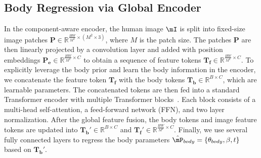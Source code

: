 \documentclass[10pt,twocolumn,letterpaper]{article}
\begin{document}
\subsection{Body Regression via Global Encoder}
\label{sec:method_2}
In the component-aware encoder, the human image $\mI$ is split into fixed-size image patches $\mathbf{P}\in \mathbb{R}^{\frac{HW}{M^2}\times (M^2\times3)}$, where $M$ is the patch size. The patches $\mathbf{P}$ are then linearly projected by a convolution layer and added with position embeddings $\mathbf{P_e} \in \mathbb{R}^{\frac{HW}{M^2}\times C}$ to obtain a sequence of feature tokens $\mathbf{T_f}\in \mathbb{R}^{\frac{HW}{M^2}\times C}$.
To explicitly leverage the body prior and learn the body information in the encoder, we concatenate the feature token $\mathbf{T_f}$ with the body tokens $\mathbf{T_b} \in \mathbb{R}^{B  \times C}$, which are learnable parameters. The concatenated tokens are then fed into a standard Transformer encoder with multiple Transformer blocks~\cite{dosovitskiy2020vit}. Each block consists of a multi-head self-attention, a feed-forward network (FFN), and two layer normalization. 
After the global feature fusion, the body tokens and image feature tokens are updated into $\mathbf{T_b}' \in \mathbb{R}^{B \times C}$ and  $\mathbf{T_f}'\in \mathbb{R}^{\frac{HW}{M^2}\times C}$. Finally, we use several fully connected layers to regress the body parameters $\hat{\mP}_{body}=\{\theta_{body} , \beta, t\}$ based on $\mathbf{T_b}'$.
\end{document}
